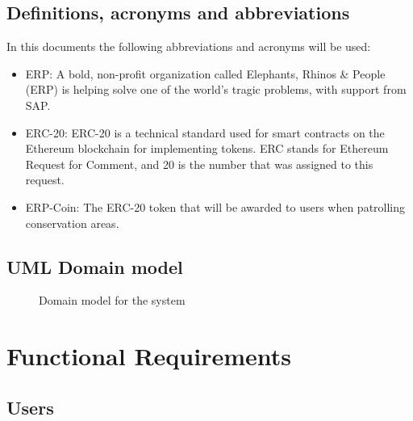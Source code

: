 \documentclass{article}
\begin{document}
\subsection{Definitions, acronyms and abbreviations}
In this documents the following abbreviations and acronyms will be used:
\begin{itemize}
\item ERP: A bold, non-profit organization called Elephants, Rhinos \& People (ERP) is helping solve one of the world’s tragic problems, with support from SAP.
\item ERC-20: ERC-20 is a technical standard used for smart contracts on the Ethereum blockchain for implementing tokens. ERC stands for Ethereum Request for Comment, and 20 is the number that was assigned to this request.
\item ERP-Coin: The ERC-20 token that will be awarded to users when patrolling conservation areas.
\end{itemize}


\subsection{UML Domain model}
\begin{figure}[!h]
\centering
{}
\caption{Domain model for the system}
\end{figure}

\section{Functional Requirements}

\subsection{Users}
\end{document}

